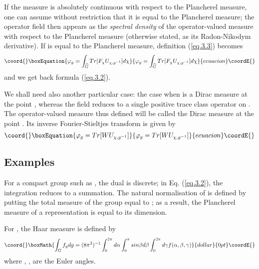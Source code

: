\documentclass[a4paper,11pt]{article}
\def\Ucgm{U_{\chi,g^{-1}}}
\begin{document}
If the measure \myHighlight{$\mu$}\coordHE{} is absolutely continuous with respect to the Plancherel measure, one can 
assume without restriction that it is equal to the Plancherel measure; the operator field \coordHE{}
then appears as the {\it spectral density} of the operator-valued measure \coordHE{} with 
respect to the 
Plancherel measure (otherwise stated, as its Radon-Nikodym derivative). If \myHighlight{$\mu$}\coordHE{} is equal to 
the Plancherel measure, definition (\ref{eq.3.3}) becomes
\begin{equation}\coord{}\boxEquation{
 \label{eq.3.4}
  \varphi_g = \int_{\Gc} Tr[F_{\chi} \Ucgm] d\chi
}{
 \varphi_g = \int_{\Gc} Tr[F_{\chi} \Ucgm] d\chi
}{ecuacion}\coordE{}\end{equation}
and we get back formula (\ref{eq.3.2}).
 
We shall need also another particular case: the case when \myHighlight{$\mu$}\coordHE{} is a Dirac measure at the 
point 
\myHighlight{$\chi \in  \Gc$}\coordHE{} , whereas the field \coordHE{} reduces to a single positive trace class operator \coordHE{} 
on \coordHE{}. The 
operator-valued measure thus defined will be called the Dirac measure \coordHE{} at the point \myHighlight{$\chi$}\coordHE{}. 
Its inverse Fourier-Stieltjes transform is given by
\begin{equation}\coord{}\boxEquation{
 \label{eq.3.5}
 \varphi_g = Tr[W \Ucgm]
}{
 \varphi_g = Tr[W \Ucgm]
}{ecuacion}\coordE{}\end{equation}

\subsection{Examples}

{\bf  {}\coordHE{}}

For a compact group such as \coordHE{}, the dual is discrete; in Eq. (\ref{eq.3.2}), the 
integration reduces to 
a summation. The natural normalisation of \coordHE{} is defined by putting the total measure of the 
group equal to \coordHE{}; as a result, the Plancherel measure of a representation is equal to its 
dimension. 

For \coordHE{}, the Haar measure is defined by
$$\coord{}\boxMath{
\int_G f_g dg = (8 \pi^2)^{-1} \int_0^{2 \pi} d\alpha \int_0^{\pi} sin \beta d\beta \int_0^{2 \pi} d\gamma f(\alpha,\beta,\gamma)
}{dollar}{0pt}\coordE{}$$
where \myHighlight{$\alpha$}\coordHE{}, \myHighlight{$\beta$}\coordHE{}, \myHighlight{$\gamma$}\coordHE{} are the Euler angles.
\end{document}
